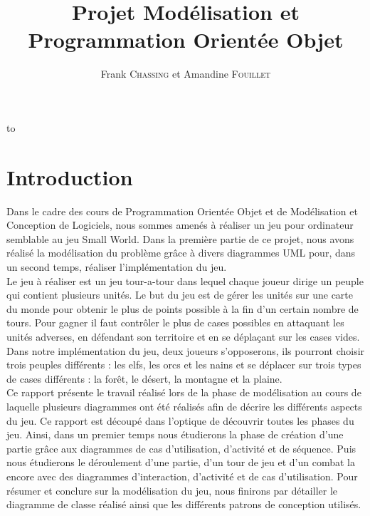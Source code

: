 \documentclass[a4paper,11pt]{article}
\author{}
\title{}
\title{\LARGE{Projet Modélisation et Programmation Orientée Objet}}
\author{Frank \textsc{Chassing} et Amandine \textsc{Fouillet}}
\makeatletter
\def\clap#1{\hbox to 0pt{\hss #1\hss}}%
\def\haut#1#2#3{%
\hbox to \hsize{%
\rlap{\vtop{\raggedright #1}}%
\hss
\clap{\vtop{\centering #2}}%
\hss
\llap{\vtop{\raggedleft #3}}}}%
\def\bas#1#2#3{%
\hbox to \hsize{%
\rlap{\vbox{\raggedright #1}}%
\hss
\clap{\vbox{\centering #2}}%
\hss
\llap{\vbox{\raggedleft #3}}}}%
\def\maketitle{%
\thispagestyle{empty}\vbox to \vsize{%
\haut{}{\@blurb}{}
\vfill
\vspace{1cm}
\begin{flushleft}
\usefont{OT1}{ptm}{m}{n}
\huge \@title
\end{flushleft}
\par
\hrule height 4pt
\par
\begin{flushright}
\usefont{OT1}{phv}{m}{n}
\Large \@author
\par
\end{flushright}
\vspace{1cm}
\vfill
\vfill
\bas{}{\@location, le \@date}{}
}%
\cleardoublepage
}
\makeatother
\begin{document}
\maketitle
\tableofcontents
\newpage
\section*{Introduction}
Dans le cadre des cours de Programmation Orientée Objet et de Modélisation et Conception de Logiciels, nous sommes amenés à réaliser un jeu pour ordinateur semblable au jeu Small World. Dans la première partie de ce projet, nous avons réalisé la modélisation du problème grâce à divers diagrammes UML pour, dans un second temps, réaliser l'implémentation du jeu. \\

Le jeu à réaliser est un jeu tour-a-tour dans lequel chaque joueur dirige un peuple qui contient plusieurs unités. Le but du jeu est de gérer les unités sur une carte du monde pour obtenir le plus de points possible à la fin d'un certain nombre de tours. Pour gagner il faut contrôler le plus de cases possibles en attaquant les unités adverses, en défendant son territoire et en se déplaçant sur les cases vides. Dans notre implémentation du jeu, deux joueurs s'opposerons, ils pourront choisir trois peuples différents : les elfs, les orcs et les nains et se déplacer sur trois types de cases différents : la forêt, le désert, la montagne et la plaine.\\

Ce rapport présente le travail réalisé lors de la phase de modélisation au cours de laquelle plusieurs diagrammes ont été réalisés afin de décrire les différents aspects du jeu. Ce rapport est découpé dans l'optique de découvrir toutes les phases du jeu. Ainsi, dans un premier temps nous étudierons la phase de création d'une partie grâce aux diagrammes de cas d'utilisation, d'activité et de séquence. Puis nous étudierons le déroulement d'une partie, d'un tour de jeu et d'un combat la encore avec des diagrammes d'interaction, d'activité et de cas d'utilisation. Pour résumer et conclure sur la modélisation du jeu, nous finirons par détailler le diagramme de classe réalisé ainsi que les différents patrons de conception utilisés.
\newpage
\end{document}
